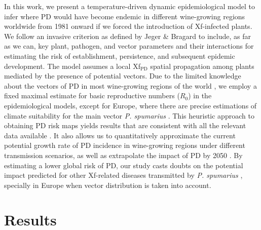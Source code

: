 In this work, we present a temperature-driven dynamic epidemiological model to
infer where PD would have become endemic in different wine-growing regions
worldwide from 1981 onward if we forced the introduction of Xf-infected plants.
We follow an invasive criterion as defined by Jeger \& Bragard \cite{Jeger2019}
to include, as far as we can, key plant, pathogen, and vector parameters and
their interactions for estimating the risk of establishment, persistence, and
subsequent epidemic development. The model assumes a local Xf$_{\textrm{PD}}$
spatial propagation among plants mediated by the presence of potential vectors.
Due to the limited knowledge about the vectors of PD in most wine-growing
regions of the world \cite{Redak2004}, we employ a fixed maximal estimate for
basic reproductive numbers ($R_0$) in the epidemiological models, except for
Europe, where there are precise estimations of climate suitability for the main
vector \textit{P. spumarius} \cite{Godefroid2021}. This heuristic approach to
obtaining PD risk maps yields results that are consistent with all the relevant
data available \cite{Bragard2019}. It also allows us to quantitatively
approximate the current potential growth rate of PD incidence in wine-growing
regions under different transmission scenarios, as well as extrapolate the
impact of PD by 2050 \cite{Webpage}. By estimating a lower global risk of PD,
our study casts doubts on the potential impact predicted for other Xf-related
diseases transmitted by \textit{P. spumarius} \cite{Schneider2020}, specially
in Europe when vector distribution is taken into account.

\section{Results}

